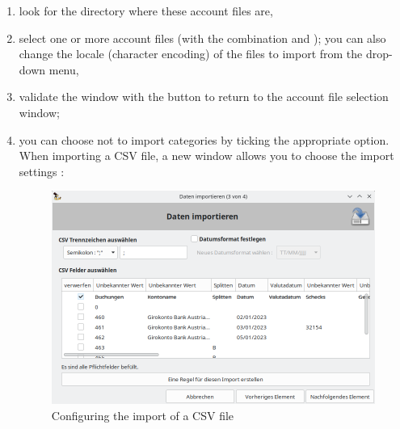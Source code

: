 \begin{enumerate}
\begin{enumerate}
\begin{figure}[htbp]
			\end{figure}
			\item look for the directory where these account files are,
			\item select one or more account files (with the combination  and ); you can also change the \gls{locale} (\gls{character encoding}) of the files to import from the  drop-down menu,
			\item validate the window with the  button to return to the account file selection window;
			\item you can choose not to import categories by ticking the appropriate option. When importing a \gls{CSV} file, a new window allows you to choose the import settings :
				\begin{itemize}[label=\textopenbullet]
					\begin{figure}[htbp]
						\raggedleft
						\includegraphics[width=.95\textwidth]{image/screenshot/importexport_import_CSV_setup}
						\caption{Configuring the import of a CSV file}%

\end{figure}
\end{itemize}
\end{enumerate}
\end{enumerate}
